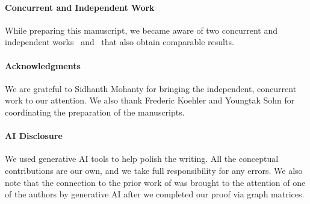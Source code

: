 \documentclass[12pt]{article}
\def\1{\bm{1}}
\newcommand{\cm}{\mathsf{M} }
\newcommand{\todo}[1]{\textcolor{red}{(#1)}}
\newcommand{\calL}{\mathcal{L}}
\newcommand{\Authornote}[3]{{\sf\footnotesize\color{#3}{[#1: #2]}}}
\newcommand{\Authornote}[3]{}
\newcommand{\jnote}[1]{\Authornote{Jeff}{#1}{blue}}
\newcommand{\snote}[1]{\Authornote{Sofia}{#1}{orange}}
\begin{document}
%




\paragraph{Concurrent and Independent Work} While preparing this manuscript, we became aware of two concurrent and independent works~\cite{KS26} and~\cite{MW26} that also obtain comparable results.

\paragraph{Acknowledgments} We are grateful to Sidhanth Mohanty for bringing the independent, concurrent work to our attention. We also thank Frederic Koehler and Youngtak Sohn for coordinating the preparation of the manuscripts.

  
\paragraph{AI Disclosure}  We used generative AI tools to help polish the writing. All the conceptual contributions are our own, and we take full responsibility for any errors. We also note that the connection to the prior work of \cite{kogan2025extremal} was brought to the attention of one of the authors by generative AI after we completed our proof via graph matrices. %
\end{document}
